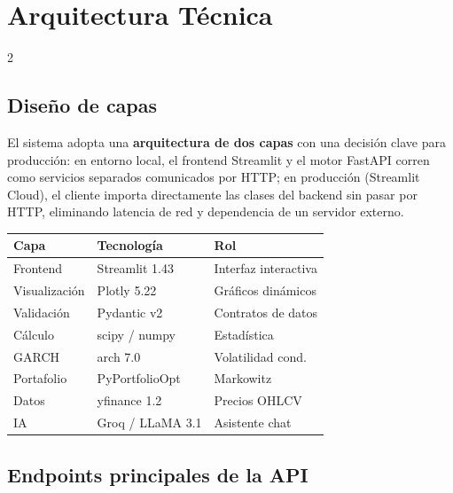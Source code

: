 \documentclass[10pt,a4paper]{article}
\begin{document}
\section{Arquitectura Técnica}

\begin{multicols}{2}

\subsection{Diseño de capas}

El sistema adopta una \textbf{arquitectura de dos capas} con una decisión clave para producción: en entorno local, el frontend Streamlit y el motor FastAPI corren como servicios separados comunicados por HTTP; en producción (Streamlit Cloud), el cliente importa directamente las clases del backend sin pasar por HTTP, eliminando latencia de red y dependencia de un servidor externo.

{\footnotesize
\begin{tabular}{@{}lll@{}}
\toprule
\textbf{Capa} & \textbf{Tecnología} & \textbf{Rol} \\
\midrule
Frontend    & Streamlit 1.43     & Interfaz interactiva \\
Visualización & Plotly 5.22      & Gráficos dinámicos \\
Validación  & Pydantic v2        & Contratos de datos \\
Cálculo     & scipy / numpy      & Estadística \\
GARCH       & arch 7.0           & Volatilidad cond. \\
Portafolio  & PyPortfolioOpt     & Markowitz \\
Datos       & yfinance 1.2       & Precios OHLCV \\
IA          & Groq / LLaMA 3.1   & Asistente chat \\
\bottomrule
\end{tabular}
}

\columnbreak

\subsection{Endpoints principales de la API}


\end{multicols}
\end{document}
